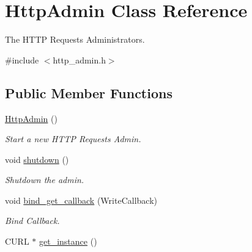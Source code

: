 \hypertarget{classHttpAdmin}{\section{Http\-Admin Class Reference}
\label{classHttpAdmin}
}


The H\-T\-T\-P Requests Administrators.  




{\ttfamily \#include $<$http\-\_\-admin.\-h$>$}

\subsection*{Public Member Functions}
\begin{DoxyCompactItemize}
\item 
\hypertarget{classHttpAdmin_ad5821eb1e159cfad6e9e0676b8d1bd8d}{\hyperlink{classHttpAdmin_ad5821eb1e159cfad6e9e0676b8d1bd8d}{Http\-Admin} ()}\label{classHttpAdmin_ad5821eb1e159cfad6e9e0676b8d1bd8d}

\begin{DoxyCompactList}\small\item\em Start a new H\-T\-T\-P Requests Admin. \end{DoxyCompactList}\item 
\hypertarget{classHttpAdmin_acebe3cde5a43db8dd67fa47b71c37996}{void \hyperlink{classHttpAdmin_acebe3cde5a43db8dd67fa47b71c37996}{shutdown} ()}\label{classHttpAdmin_acebe3cde5a43db8dd67fa47b71c37996}

\begin{DoxyCompactList}\small\item\em Shutdown the admin. \end{DoxyCompactList}\item 
\hypertarget{classHttpAdmin_a8342985fecdaffdf72ee3a6f767236a7}{void \hyperlink{classHttpAdmin_a8342985fecdaffdf72ee3a6f767236a7}{bind\-\_\-get\-\_\-callback} (Write\-Callback)}\label{classHttpAdmin_a8342985fecdaffdf72ee3a6f767236a7}

\begin{DoxyCompactList}\small\item\em Bind Callback. \end{DoxyCompactList}\item 
\hypertarget{classHttpAdmin_abb47ebccfb59e2f11dac994d5c44fe7e}{C\-U\-R\-L $\ast$ \hyperlink{classHttpAdmin_abb47ebccfb59e2f11dac994d5c44fe7e}{get\-\_\-instance} ()}\label{classHttpAdmin_abb47ebccfb59e2f11dac994d5c44fe7e}


\end{DoxyCompactItemize}
